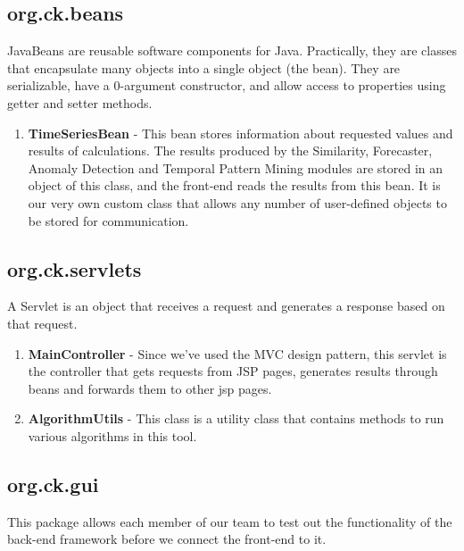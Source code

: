 \documentclass[12pt]{report}
\begin{document}
\subsection{org.ck.beans}

JavaBeans are reusable software components for Java. Practically, they are classes that encapsulate many objects into a single object (the bean). They are serializable, have a 0-argument constructor, and allow access to properties using getter and setter methods.

\begin{enumerate}

\item{\textbf{TimeSeriesBean} - This bean stores information about requested values and results of calculations. The results produced by the Similarity, Forecaster, Anomaly Detection and Temporal Pattern Mining modules are stored in an object of this class, and the front-end reads the results from this bean. It is our very own custom class that allows any number of user-defined objects to be stored for communication.}

\end{enumerate}

\subsection{org.ck.servlets}

A Servlet is an object that receives a request and generates a response based on that request. 

\begin{enumerate}

\item{\textbf{MainController} - Since we've used the MVC design pattern, this servlet is the controller that gets requests from JSP pages, generates results through beans and forwards them to other jsp pages.}

\item{\textbf{AlgorithmUtils} - This class is a utility class that contains methods to run various algorithms in this tool.}

\end{enumerate}

\subsection{org.ck.gui}

This package allows each member of our team to test out the functionality of the back-end framework before we connect the front-end to it.
\end{document}
